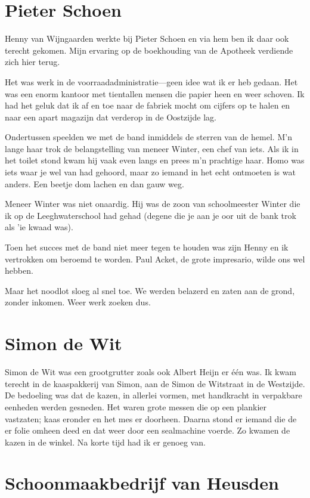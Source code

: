 \documentclass[10pt,twoside,openright]{memoir}
\begin{document}
\chapter{Pieter Schoen} %
\label{cha:schoen}

Henny van Wijngaarden werkte bij Pieter Schoen en via hem ben ik daar ook terecht gekomen. Mijn ervaring op de boekhouding van de Apotheek verdiende zich hier terug.

Het was werk in de voorraadadministratie---geen idee wat ik er heb gedaan. Het was een enorm kantoor met tientallen mensen die papier heen en weer schoven. Ik had het geluk dat ik af en toe naar de fabriek mocht om cijfers op te halen en naar een apart magazijn dat verderop in de Oostzijde lag. 

Ondertussen speelden we met de band inmiddels de sterren van de hemel. M’n lange haar trok de belangstelling van meneer Winter, een chef van iets. Als ik in het toilet stond kwam hij vaak even langs en prees m’n prachtige haar. Homo was iets waar je wel van had gehoord, maar zo iemand in het echt ontmoeten is wat anders. Een beetje dom lachen en dan gauw weg. 

Meneer Winter was niet onaardig. Hij was de zoon van schoolmeester Winter die ik op de Leeghwaterschool had gehad (degene die je aan je oor uit de bank trok als 'ie kwaad was). 

Toen het succes met de band niet meer tegen te houden was zijn Henny en ik vertrokken om beroemd te worden. Paul Acket, de grote impresario, wilde ons wel hebben.

Maar het noodlot sloeg al snel toe. We werden belazerd en zaten aan de grond, zonder inkomen. Weer werk zoeken dus.

\chapter{Simon de Wit} %
\label{cha:wit}

Simon de Wit was een grootgrutter zoals ook Albert Heijn er één was. Ik kwam terecht in de kaaspakkerij van Simon, aan de Simon de Witstraat in de Westzijde. De bedoeling was dat de kazen, in allerlei vormen, met handkracht in verpakbare eenheden werden gesneden. Het waren grote messen die op een plankier vastzaten; kaas eronder en het mes er doorheen. Daarna stond er iemand die de er folie omheen deed en dat weer door een sealmachine voerde. Zo kwamen de kazen in de winkel. Na korte tijd had ik er genoeg van.

\chapter{Schoonmaakbedrijf van Heusden} %
\label{cha:schoonmaakbedrijf}
\end{document}
